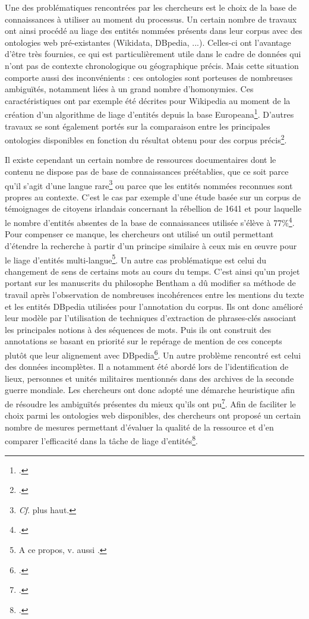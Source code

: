 \documentclass[a4paper,12pt,twoside]{book}
\begin{document}
	Une des problématiques rencontrées par les chercheurs est le choix de la base de connaissances à utiliser au moment du processus. Un certain nombre de travaux ont ainsi procédé au liage des entités nommées présents dans leur corpus avec des ontologies web pré-existantes (Wikidata, DBpedia, ...). Celles-ci ont l'avantage d'être très fournies, ce qui est particulièrement utile dans le cadre de données qui n'ont pas de contexte chronologique ou géographique précis. Mais cette situation comporte aussi des inconvénients : ces ontologies sont porteuses de nombreuses ambiguïtés, notamment liées à un grand nombre d'homonymies. Ces caractéristiques ont par exemple été décrites pour Wikipedia au moment de la création d'un algorithme de liage d'entités depuis la base Europeana\footcite{agirre_matching_2012}. D'autres travaux se sont également portés sur la comparaison entre les principales ontologies disponibles en fonction du résultat obtenu pour des corpus précis\footcite{soudani_adaptation_2018}.
	
	Il existe cependant un certain nombre de ressources documentaires dont le contenu ne dispose pas de base de connaissances préétablies, que ce soit parce qu'il s'agit d'une langue rare\footnote{\textit{Cf}. plus haut.} ou parce que les entités nommées reconnues sont propres au contexte. C'est le cas par exemple d'une étude basée sur un corpus de témoignages de citoyens irlandais concernant la rébellion de 1641 et pour laquelle le nombre d'entités absentes de la base de connaissances utilisée s'élève à 77\%\footcite{munnelly_investigating_2018}. Pour compenser ce manque, les chercheurs ont utilisé un outil permettant d'étendre la recherche à partir d'un principe similaire à ceux mis en œuvre pour le liage d'entités multi-langue\footnote{A ce propos, v. aussi \cite{mika_agdistis_2014}.}. Un autre cas problématique est celui du changement de sens de certains mots au cours du temps. C'est ainsi qu'un projet portant sur les manuscrits du philosophe Bentham a dû modifier sa méthode de travail après l'observation de nombreuses incohérences entre les mentions du texte et les entités DBpedia utilisées pour l'annotation du corpus. Ils ont donc amélioré leur modèle par l'utilisation de techniques d'extraction de phrases-clés associant les principales notions à des séquences de mots. Puis ils ont construit des annotations se basant en priorité sur le repérage de mention de ces concepts plutôt que leur alignement avec DBpedia\footcite{ruiz_mapping_2019}. Un autre problème rencontré est celui des données incomplètes. Il a notamment été abordé lors de l'identification de lieux, personnes et unités militaires mentionnés dans des archives de la seconde guerre mondiale. Les chercheurs ont donc adopté une démarche heuristique afin de résoudre les ambiguïtés présentes du mieux qu'ils ont pu\footcite{heino_named_2017}. Afin de faciliter le choix parmi les ontologies web disponibles, des chercheurs ont proposé un certain nombre de mesures permettant d'évaluer la qualité de la ressource et d'en comparer l'efficacité dans la tâche de liage d'entités\footcite{abadie_evaluation_2017}.
	
\end{document}
